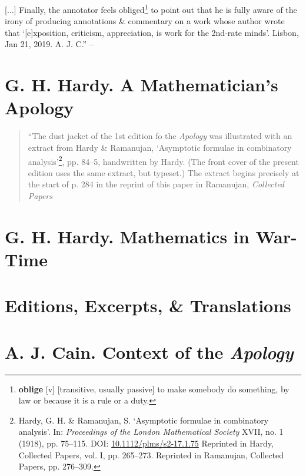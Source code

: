 \documentclass[oneside]{book}
\numberwithin{equation}{section}
\begin{document}
[$\ldots$] Finally, the annotator feels obliged\footnote{\textbf{oblige} [v] [transitive, usually passive] to make somebody do something, by law or because it is a rule or a duty.} to point out that he is fully aware of the irony of producing annotations \& commentary on a work whose author wrote that `[e]xposition, criticism, appreciation, is work for the 2nd-rate minds'. Lisbon, Jan 21, 2019. A. J. C.'' -- \cite[pp. v--vii]{Hardy2022}


\section{G. H. Hardy. A Mathematician's Apology}
\begin{quotation}
	``The dust jacket of the 1st edition fo the \textit{Apology} was illustrated with an extract from Hardy \& Ramanujan, `Asymptotic formulae in combinatory analysis'\footnote{Hardy, G. H. \& Ramanujan, S. `Asymptotic formulae in combinatory analysis'. In: \textit{Proceedings of the London Mathematical Society} XVII, no. 1 (1918), pp. 75--115. DOI: \url{10.1112/plms/s2-17.1.75} Reprinted in Hardy, Collected Papers, vol. I, pp. 265--273. Reprinted in Ramanujan, Collected Papers, pp. 276--309.}, pp. 84--5, handwritten by Hardy. (The front cover of the present edition uses the same extract, but typeset.) The extract begins precisely at the start of p. 284 in the reprint of this paper in Ramanujan, \textit{Collected Papers}
\end{quotation}


\section{G. H. Hardy. Mathematics in War-Time}


\section{Editions, Excerpts, \& Translations}


\section{A. J. Cain. Context of the \textit{Apology}}
\end{document}
